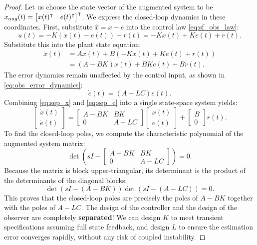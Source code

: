 \begin{proof}
Let us choose the state vector of the augmented system to be $x_{aug}(t) = \begin{bmatrix} x(t)^\intercal & e(t)^\intercal \end{bmatrix}^\intercal$. We express the closed-loop dynamics in these coordinates.
First, substitute $\hat{x} = x - e$ into the control law \eqref{eq:sf_obs_law}:
\begin{equation}
u(t) = -K (x(t) - e(t)) + r(t) = -K x(t) + K e(t) + r(t) .
\end{equation}
Substitute this into the plant state equation:
\begin{align}
    \dot{x}(t) &= A x(t) + B \left( -K x(t) + K e(t) + r(t) \right) \nonumber \\
    &= (A - B K) x(t) + B K e(t) + B r(t) . \label{eq:sep_x}
\end{align}
The error dynamics remain unaffected by the control input, as shown in \eqref{eq:obs_error_dynamics}:
\begin{equation}
    \dot{e}(t) = (A - L C) e(t) . \label{eq:sep_e}
\end{equation}
Combining \eqref{eq:sep_x} and \eqref{eq:sep_e} into a single state-space system yields:
\begin{equation}
    \begin{bmatrix} \dot{x}(t) \\ \dot{e}(t) \end{bmatrix} = \begin{bmatrix} A - B K & B K \\ 0 & A - L C \end{bmatrix} \begin{bmatrix} x(t) \\ e(t) \end{bmatrix} + \begin{bmatrix} B \\ 0 \end{bmatrix} r(t) . \label{eq:sep_augmented}
\end{equation}
To find the closed-loop poles, we compute the characteristic polynomial of the augmented system matrix:
\begin{equation}
\det \left( s I - \begin{bmatrix} A - B K & B K \\ 0 & A - L C \end{bmatrix} \right) = 0 .
\end{equation}
Because the matrix is block upper-triangular, its determinant is the product of the determinants of the diagonal blocks:
\begin{equation}
\det \left( s I - (A - B K) \right) \det \left( s I - (A - L C) \right) = 0 .
\end{equation}
This proves that the closed-loop poles are precisely the poles of $A - B K$ together with the poles of $A - L C$. The design of the controller and the design of the observer are completely \textbf{separated}! We can design $K$ to meet transient specifications assuming full state feedback, and design $L$ to ensure the estimation error converges rapidly, without any risk of coupled instability.
\end{proof}

